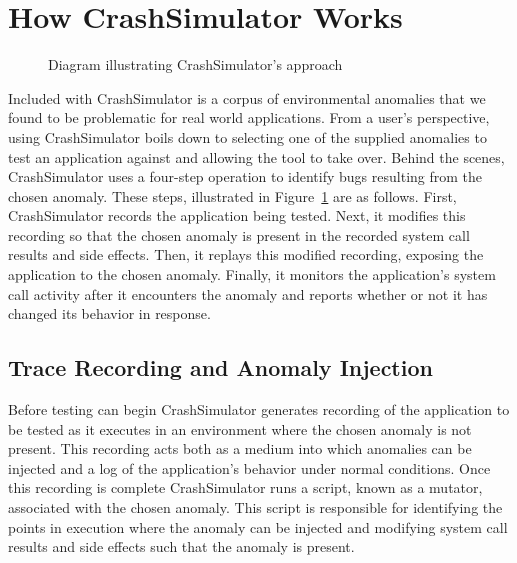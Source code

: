 \section{How CrashSimulator Works}
\label{SEC:approach}

\begin{figure}[t]
  \center{}
  \caption{Diagram illustrating CrashSimulator's approach}
  \label{figure:approach}
\end{figure}

Included with CrashSimulator is a corpus of environmental anomalies
that we found to be problematic for real world
applications.
From a user's perspective, using CrashSimulator boils down to selecting one
of the supplied anomalies to test an application against and allowing the
tool to take over.  Behind the scenes,
CrashSimulator uses a four-step operation to identify bugs resulting from
the chosen anomaly.
These steps, illustrated in Figure~\ref{figure:approach} are as follows.
First, CrashSimulator records the application being tested.  Next, it
modifies this recording so that the chosen anomaly is present in the
recorded system call results and side effects.  Then, it replays this
modified recording, exposing the application to the chosen anomaly.
Finally, it monitors the application's system call activity after it
encounters the anomaly and reports whether or not it has changed its
behavior in response.

\subsection{Trace Recording and Anomaly Injection}

Before testing can begin
CrashSimulator generates recording of the application to be
tested as it executes in an environment where the chosen anomaly is not
present.  This recording acts both as a medium into which anomalies can be
injected and a log of the application's behavior under normal
conditions.  Once this recording is complete CrashSimulator runs a script,
known as a mutator, associated with the chosen anomaly.
This script is responsible for identifying
the points in execution where the anomaly can be injected and modifying
system call results and side effects such that the anomaly is present.

